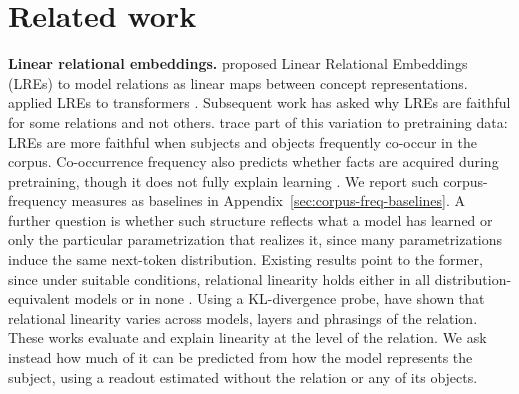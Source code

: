 \section{Related work}

\textbf{Linear relational embeddings.}
\citet{DBLP:conf/icml/PaccanaroH00} proposed Linear
Relational Embeddings (LREs) to model
relations as linear maps
between concept representations.
\citet{hernandez2024linearity} applied LREs
to transformers \citep{vaswani2017attention}.
Subsequent work has asked why LREs are faithful for some
relations and not others.
\citet{merullo2025linear} trace part of this
variation to pretraining data: LREs are more faithful when subjects and
objects frequently co-occur in the corpus. Co-occurrence frequency also predicts whether
facts are acquired during pretraining, though it does not fully explain
learning \citep{10.1162/TACL.a.746}. We report such corpus-frequency measures as baselines in Appendix~\ref{sec:corpus-freq-baselines}. A further question is whether such
structure reflects what a model has learned or only the particular
parametrization that realizes it, since many parametrizations induce the
same next-token distribution. Existing results point to the former,
since under suitable conditions, relational linearity holds either in
all distribution-equivalent models or in none \citep{marconato2025all}.
Using a KL-divergence probe,
\citet{valer2026relational} have shown
that relational linearity varies across models, layers and phrasings of the relation.
These works evaluate and explain linearity at the level of the relation.
We ask instead how much of it can be predicted from how the model
represents the subject, using a readout estimated without the relation
or any of its objects.



